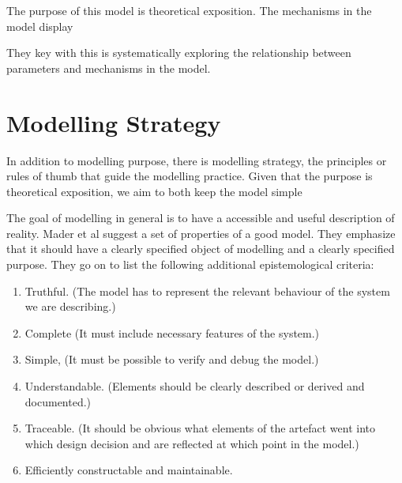 The purpose of this model is theoretical exposition. The mechanisms in the model display

They key with this is systematically exploring the relationship between parameters and mechanisms in the model. 

\section{Modelling Strategy}

In addition to modelling purpose, there is modelling strategy, the principles or rules of thumb that guide the modelling practice. Given that the purpose is theoretical exposition, we aim to both keep the model simple %

The goal of modelling in general is to have a accessible and useful description of reality.  Mader et al \cite{maderConstructionVerificationModels2007} suggest a set of properties of a good model. They emphasize that it should have a clearly specified object of modelling and  a clearly specified purpose. They go on to list the  following additional epistemological criteria:
\begin{enumerate}   
\item  Truthful. (The model has to represent the relevant behaviour of the system we are describing.) 
\item  Complete (It must include necessary features of the system.)
\item Simple,  (It must be possible to verify and debug the model.)
\item Understandable. (Elements should be clearly described or derived and documented.)
\item  Traceable.  (It should be obvious what elements of the artefact went into which design decision and are reflected at which point in the model.)
\item  Efficiently constructable and maintainable. 
\end{enumerate}

